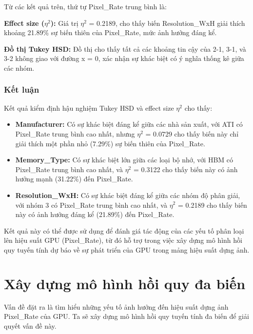 Từ các kết quả trên, thứ tự Pixel\_Rate trung bình là:

\begin{center}
\end{center}

\textbf{Effect size ($\eta^2$):} Giá trị $\eta^2$ = 0.2189, cho thấy biến Resolution\_WxH giải thích khoảng 21.89\% sự biến thiên của Pixel\_Rate, mức ảnh hưởng đáng kể.

\textbf{Đồ thị Tukey HSD:} Đồ thị cho thấy tất cả các khoảng tin cậy của 2-1, 3-1, và 3-2 không giao với đường x = 0, xác nhận sự khác biệt có ý nghĩa thống kê giữa các nhóm.

\subsubsection{Kết luận}

Kết quả kiểm định hậu nghiệm Tukey HSD và effect size $\eta^2$ cho thấy:
\begin{itemize}
    \item \textbf{Manufacturer:} Có sự khác biệt đáng kể giữa các nhà sản xuất, với ATI có Pixel\_Rate trung bình cao nhất, nhưng $\eta^2$ = 0.0729 cho thấy biến này chỉ giải thích một phần nhỏ (7.29\%) sự biến thiên của Pixel\_Rate.
    \item \textbf{Memory\_Type:} Có sự khác biệt lớn giữa các loại bộ nhớ, với HBM có Pixel\_Rate trung bình cao nhất, và $\eta^2$ = 0.3122 cho thấy biến này có ảnh hưởng mạnh (31.22\%) đến Pixel\_Rate.
    \item \textbf{Resolution\_WxH:} Có sự khác biệt đáng kể giữa các nhóm độ phân giải, với nhóm 3 có Pixel\_Rate trung bình cao nhất, và $\eta^2$ = 0.2189 cho thấy biến này có ảnh hưởng đáng kể (21.89\%) đến Pixel\_Rate.
\end{itemize}
    
Kết quả này có thể được sử dụng để đánh giá tác động của các yếu tố phân loại lên hiệu suất GPU (Pixel\_Rate), từ đó hỗ trợ trong việc xây dựng mô hình hồi quy tuyến tính dự báo về sự phát triển của GPU trong mảng hiệu suất dựng ảnh.

\section{Xây dựng mô hình hồi quy đa biến}

Vấn đề đặt ra là tìm hiểu những yếu tố ảnh hưởng đến hiệu suất dựng ảnh Pixel\_Rate của GPU. Ta sẽ xây dựng mô hình hồi quy tuyến tính đa biến để giải quyết vấn đề này.
    
